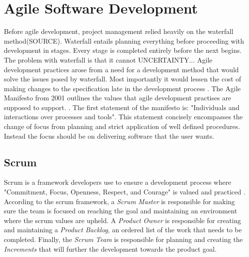 

\section{Agile Software Development}
Before agile development, project management relied heavily on the waterfall method(SOURCE). Waterfall entails planning everything before proceeding with development in stages. Every stage is completed entirely before the next begins. The problem with waterfall is that it cannot UNCERTAINTY... Agile development practices arose from a need for a development method that would solve the issues posed by waterfall. Most importantly it would lessen the cost of making changes to the specification late in the development process \cite{alancline}. The Agile Manifesto from 2001 outlines the values that agile development practises are supposed to support. \cite{beck2001agile}. The first statement of the manifesto is: "Individuals and interactions over processes and tools"\cite{beck2001agile}. This statement concisely encompasses the change of focus from planning and strict application of well defined procedures. Instead the focus should be on delivering software that the user wants.



\subsection{Scrum}
Scrum is a framework developers use to ensure a development process where "Commitment, Focus, Openness, Respect, and Courage" is valued and practiced \cite{schwaber_sutherland_2022}. According to the scrum framework, a \emph{Scrum Master} is responsible for making sure the team is focused on reaching the goal and maintaining an environment where the scrum values are upheld. A \emph{Product Owner} is responsible for creating and maintaining a \emph{Product Backlog}, an ordered list of the work that needs to be completed. Finally, the \emph{Scrum Team} is responsible for planning and creating the \emph{Increments} that will further the development towards the product goal. 


